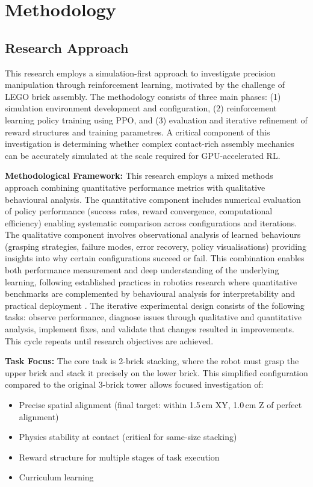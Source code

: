 \documentclass[12pt,a4paper,oneside]{report}
\begin{document}
\chapter{Methodology}

\section{Research Approach}

This research employs a simulation-first approach to investigate precision manipulation through reinforcement learning, motivated by the challenge of LEGO brick assembly. The methodology consists of three main phases: (1) simulation environment development and configuration, (2) reinforcement learning policy training using PPO, and (3) evaluation and iterative refinement of reward structures and training parametres. A critical component of this investigation is determining whether complex contact-rich assembly mechanics can be accurately simulated at the scale required for GPU-accelerated RL.

\textbf{Methodological Framework:}
This research employs a mixed methods approach combining quantitative performance metrics with qualitative behavioural analysis. The quantitative component includes numerical evaluation of policy performance (success rates, reward convergence, computational efficiency) enabling systematic comparison across configurations and iterations. The qualitative component involves observational analysis of learned behaviours (grasping strategies, failure modes, error recovery, policy visualisations) providing insights into why certain configurations succeed or fail. This combination enables both performance measurement and deep understanding of the underlying learning, following established practices in robotics research where quantitative benchmarks are complemented by behavioural analysis for interpretability and practical deployment \cite{chengZeroshotSimtorealTransfer2023}. The iterative experimental design consists of the following tasks: observe performance, diagnose issues through qualitative and quantitative analysis, implement fixes, and validate that changes resulted in improvements. This cycle repeats until research objectives are achieved.

\textbf{Task Focus:}
The core task is 2-brick stacking, where the robot must grasp the upper brick and stack it precisely on the lower brick. This simplified configuration compared to the original 3-brick tower allows focused investigation of:
\begin{itemize}
    \item Precise spatial alignment (final target: within 1.5\,cm XY, 1.0\,cm Z of perfect alignment)
    \item Physics stability at contact (critical for same-size stacking)
    \item Reward structure for multiple stages of task execution
    \item Curriculum learning
\end{itemize}
\end{document}
